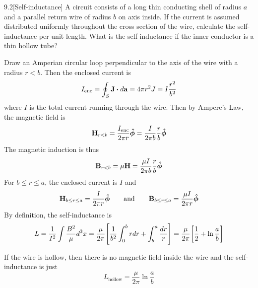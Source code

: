 \documentclass[12pt]{article}
\begin{document}
\begin{problem}{9.2}[Self-inductance]
A circuit consists of a long thin conducting shell of radius $a$ and a parallel
return wire of radius $b$ on axis inside. If the current is assumed distributed
uniformly throughout the cross section of the wire, calculate the
self-inductance per unit length. What is the self-inductance if the inner
conductor is a thin hollow tube?
\begin{solution}
Draw an Amperian circular loop perpendicular to the axis of the wire with a
radius $r<b$. Then the enclosed current is
\begin{equation}
    I_\text{enc}=\oint_S\vb{J}\vdot d\vb{a}=
    4\pi r^2J=I\frac{r^2}{b^2}
\end{equation}
where $I$ is the total current running through the wire. Then by Ampere's Law,
the magnetic field is
\begin{equation}
    \vb{H}_{r<b}=\frac{I_\text{enc}}{2\pi r}\bm{\hat{\phi}}
    =\frac{I}{2\pi b}\frac{r}{b}\bm{\hat{\phi}}
\end{equation}
The magnetic induction is thus
\begin{equation}
    \vb{B}_{r<b}=\mu\vb{H}=\frac{\mu I}{2\pi b}\frac{r}{b}\bm{\hat{\phi}}
\end{equation}
For $b\leq r\leq a$, the enclosed current is $I$ and
\begin{equation}
    \vb{H}_{b\leq r\leq a}=\frac{I}{2\pi r}\bm{\hat{\phi}}
    \qquad\text{and}\qquad
    \vb{B}_{b\leq r\leq a}=\frac{\mu I}{2\pi r}\bm{\hat{\phi}}
\end{equation}
By definition, the self-inductance is
\begin{align}
    L
    =\frac1{I^2}\int\frac{B^2}{\mu}d^3x
    =\frac{\mu}{2\pi}\qty[\frac1{b^2}\int_0^brdr+\int_b^a\frac{dr}{r}]
    =\frac{\mu}{2\pi}\qty[\frac12+\ln\frac{a}{b}]
\end{align}

If the wire is hollow, then there is no magnetic field inside the wire and the
self-inductance is just
\begin{equation}
    L_\text{hollow}=\frac{\mu}{2\pi}\ln\frac{a}{b} 
\end{equation}
\end{solution}
\end{problem}
\end{document}
